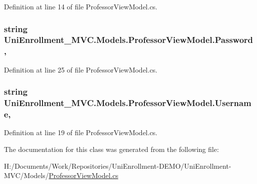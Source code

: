 Definition at line 14 of file Professor\+View\+Model.\+cs.

\subsubsection[{\texorpdfstring{Password}{Password}}]{\setlength{\rightskip}{0pt plus 5cm}string Uni\+Enrollment\+\_\+\+M\+V\+C.\+Models.\+Professor\+View\+Model.\+Password\hspace{0.3cm}{\ttfamily [get]}, {\ttfamily [set]}}\hypertarget{class_uni_enrollment___m_v_c_1_1_models_1_1_professor_view_model_a925e191c8c2babf6240a7c99fb2c08b5}{}\label{class_uni_enrollment___m_v_c_1_1_models_1_1_professor_view_model_a925e191c8c2babf6240a7c99fb2c08b5}


Definition at line 25 of file Professor\+View\+Model.\+cs.

\subsubsection[{\texorpdfstring{Username}{Username}}]{\setlength{\rightskip}{0pt plus 5cm}string Uni\+Enrollment\+\_\+\+M\+V\+C.\+Models.\+Professor\+View\+Model.\+Username\hspace{0.3cm}{\ttfamily [get]}, {\ttfamily [set]}}\hypertarget{class_uni_enrollment___m_v_c_1_1_models_1_1_professor_view_model_a4a8450ec4af630eb473c2f88036cb26a}{}\label{class_uni_enrollment___m_v_c_1_1_models_1_1_professor_view_model_a4a8450ec4af630eb473c2f88036cb26a}


Definition at line 19 of file Professor\+View\+Model.\+cs.



The documentation for this class was generated from the following file\+:\begin{DoxyCompactItemize}
\item 
H\+:/\+Documents/\+Work/\+Repositories/\+Uni\+Enrollment-\/\+D\+E\+M\+O/\+Uni\+Enrollment-\/\+M\+V\+C/\+Models/\hyperlink{_professor_view_model_8cs}{Professor\+View\+Model.\+cs}\end{DoxyCompactItemize}
